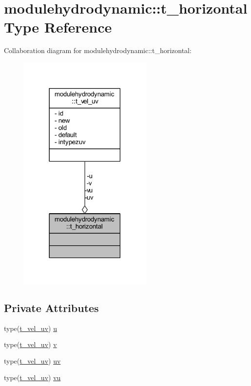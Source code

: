 \hypertarget{structmodulehydrodynamic_1_1t__horizontal}{}\section{modulehydrodynamic\+:\+:t\+\_\+horizontal Type Reference}
\label{structmodulehydrodynamic_1_1t__horizontal}


Collaboration diagram for modulehydrodynamic\+:\+:t\+\_\+horizontal\+:\nopagebreak
\begin{figure}[H]
\begin{center}
\leavevmode
\includegraphics[width=189pt]{structmodulehydrodynamic_1_1t__horizontal__coll__graph}
\end{center}
\end{figure}
\subsection*{Private Attributes}
\begin{DoxyCompactItemize}
\item 
type(\mbox{\hyperlink{structmodulehydrodynamic_1_1t__vel__uv}{t\+\_\+vel\+\_\+uv}}) \mbox{\hyperlink{structmodulehydrodynamic_1_1t__horizontal_a714ef118724bb4866a97d3e4d9179875}{u}}
\item 
type(\mbox{\hyperlink{structmodulehydrodynamic_1_1t__vel__uv}{t\+\_\+vel\+\_\+uv}}) \mbox{\hyperlink{structmodulehydrodynamic_1_1t__horizontal_aa0223dcc6a38dcc8ac785d00a4aa02a2}{v}}
\item 
type(\mbox{\hyperlink{structmodulehydrodynamic_1_1t__vel__uv}{t\+\_\+vel\+\_\+uv}}) \mbox{\hyperlink{structmodulehydrodynamic_1_1t__horizontal_afe581d4d03d3809c81cdc331bd355383}{uv}}
\item 
type(\mbox{\hyperlink{structmodulehydrodynamic_1_1t__vel__uv}{t\+\_\+vel\+\_\+uv}}) \mbox{\hyperlink{structmodulehydrodynamic_1_1t__horizontal_ac822a38bf01083262c837d8c0706534b}{vu}}
\end{DoxyCompactItemize}


